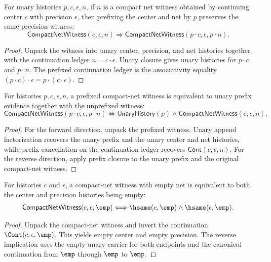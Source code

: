 \begin{theorem}
\label{thm:compact-net-witness-prefix-closed}
For unary histories $p,c,\epsilon,n$, if $n$ is a compact net witness obtained
by continuing center $c$ with precision $\epsilon$, then prefixing the center
and net by $p$ preserves the same precision witness:
$$
\mathsf{CompactNetWitness}(c,\epsilon,n)
\Longrightarrow
\mathsf{CompactNetWitness}(p \cdot c,\epsilon,p \cdot n).
$$
\end{theorem}
\begin{proof}
Unpack the witness into unary center, precision, and net histories together
with the continuation ledger $n=c\cdot\epsilon$. Unary closure gives unary
histories for $p\cdot c$ and $p\cdot n$. The prefixed continuation ledger is
the associativity equality $(p\cdot c)\cdot\epsilon=p\cdot(c\cdot\epsilon)$.
\end{proof}

\begin{theorem}
\label{thm:compact-net-witness-prefix-iff}
For histories $p,c,\epsilon,n$, a prefixed compact-net witness is equivalent
to unary prefix evidence together with the unprefixed witness:
$$
\mathsf{CompactNetWitness}(p \cdot c,\epsilon,p \cdot n)
\Longleftrightarrow
\mathsf{UnaryHistory}(p)\wedge
\mathsf{CompactNetWitness}(c,\epsilon,n).
$$
\end{theorem}
\begin{proof}
For the forward direction, unpack the prefixed witness. Unary append
factorization recovers the unary prefix and the unary center and net histories,
while prefix cancellation on the continuation ledger recovers
$\mathsf{Cont}(c,\epsilon,n)$. For the reverse direction, apply prefix closure
to the unary prefix and the original compact-net witness.
\end{proof}

\begin{theorem}
\label{thm:compact-net-witness-empty-net-iff}
For histories $c$ and $\epsilon$, a compact-net witness with empty net is
equivalent to both the center and precision histories being empty:
$$
\mathsf{CompactNetWitness}(c,\epsilon,\emp)
\Longleftrightarrow
\hsame(c,\emp)\land\hsame(\epsilon,\emp).
$$
\end{theorem}
\begin{proof}
Unpack the compact-net witness and invert the continuation
$\Cont(c,\epsilon,\emp)$. This yields empty center and empty precision. The
reverse implication uses the empty unary carrier for both endpoints and the
canonical continuation from $\emp$ through $\emp$ to $\emp$.
\end{proof}

